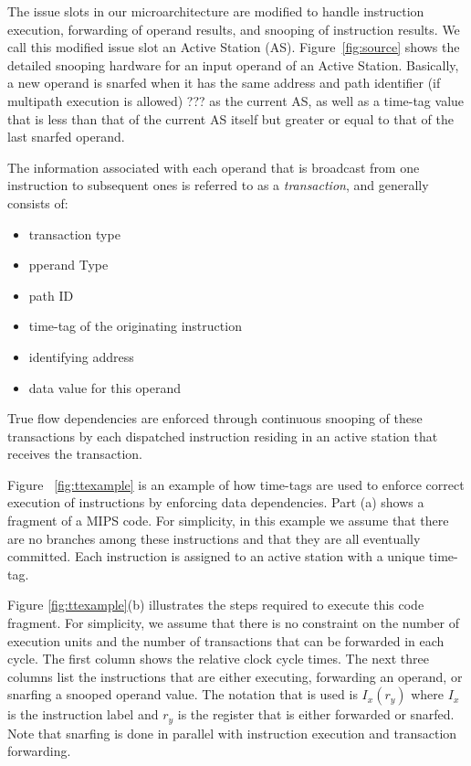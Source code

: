 \documentclass[10pt,twocolumn]{IEEEtran}
\begin{document}
\begin{figure*}[th]
\centering
{}
\caption{Example instruction execution.}
\label{fig:ttexample}
\end{figure*}  

The issue slots in our microarchitecture are modified to handle
instruction execution, forwarding of operand results, 
and snooping of instruction results.  
We call this modified issue slot an Active Station (AS).
Figure~\ref{fig:source} shows the detailed snooping hardware for an
input operand of an Active Station. 
Basically, a new operand is snarfed
when it has the same address and path identifier (if multipath execution
is allowed) ??? as the current AS, as well as a time-tag value that is less
than that of the current AS itself but greater or equal to that of the
last snarfed operand.

The information associated with each operand that is broadcast from
one instruction to subsequent ones is referred to as a
\emph{transaction}, and generally consists of:

\begin{itemize}
\item transaction type
\item pperand Type
\item path ID
\item time-tag of the originating instruction
\item identifying address
\item data value for this operand
\end{itemize}

True flow dependencies are enforced through continuous snooping of
these transactions by each dispatched instruction residing in an
active station that receives the transaction.

Figure ~\ref{fig:ttexample} is an example of how time-tags are used to
enforce correct execution of instructions by enforcing data
dependencies.  Part (a) shows a fragment of a MIPS code.  For
simplicity, in this example we assume that there are no branches among
these instructions and that they are all eventually committed.  Each
instruction is assigned to an active station with a unique time-tag.

Figure \ref{fig:ttexample}(b) illustrates the 
steps required to execute this code fragment.  
For simplicity, we assume that there is no constraint on the
number of execution units and the number of transactions that can be
forwarded in each cycle.  The first column shows the relative clock
cycle times.  The next three columns list the instructions that are
either executing, forwarding an operand, or snarfing a snooped operand
value.  The notation that is used is $I_x(r_y)$ where $I_x$ is the
instruction label and $r_y$ is the register that is either forwarded or
snarfed.  Note that snarfing is done in parallel with instruction
execution and transaction forwarding.
\end{document}
